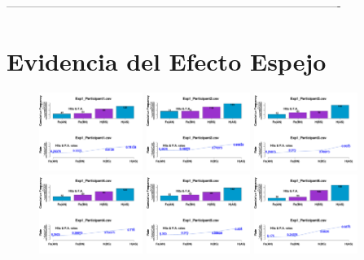 ----------------------------------------------------------------------------------------

\section{Evidencia del Efecto Espejo}


\begin{figure}[th]
\centering
\includegraphics[width=0.30\textwidth]{Figures/MirrorRate_Exp1_P1} \includegraphics[width=0.30\textwidth]{Figures/MirrorRate_Exp1_P2} \includegraphics[width=0.30\textwidth]{Figures/MirrorRate_Exp1_P3}
\includegraphics[width=0.30\textwidth]{Figures/MirrorRate_Exp1_P4} \includegraphics[width=0.30\textwidth]{Figures/MirrorRate_Exp1_P5} \includegraphics[width=0.30\textwidth]{Figures/MirrorRate_Exp1_P6}

\end{figure}
